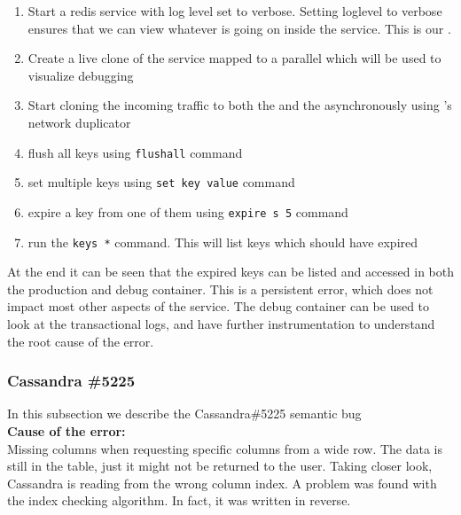 \begin{adjustwidth}{0.5cm}{}
	\begin{enumerate}
			\item Start a redis service with log level set to verbose. Setting loglevel to verbose ensures that we can view whatever is going on inside the service. This is our \productioncontainer.
			\item Create a live clone of the service mapped to a parallel \debugcontainer which will be used to visualize debugging
			\item Start cloning the incoming traffic to both the \productioncontainer and the \debugcontainer asynchronously using \parikshan's network duplicator
			\item flush all keys using \texttt{flushall} command 
			\item set multiple keys using \texttt{set key value} command 
			\item expire a key from one of them using \texttt{expire s 5} command
			\item run the \texttt{keys *} command. This will list keys which should have expired
	\end{enumerate}

\end{adjustwidth}


At the end it can be seen that the expired keys can be listed and accessed in both the production and debug container. This is a persistent error, which does not impact most other aspects of the service. The debug container can be used to look at the transactional logs, and have further instrumentation to understand the root cause of the error.

\subsubsection{Cassandra \#5225}

In this subsection we describe the Cassandra\#5225 semantic bug \\

\noindent \textbf{Cause of the error:} \\

Missing columns when requesting specific columns from a wide row. 
The data is still in the table, just it might not be returned to the user. 
Taking closer look, Cassandra is reading from the wrong column index. 
A problem was found with the index checking algorithm. 
In fact, it was written in reverse.\\

